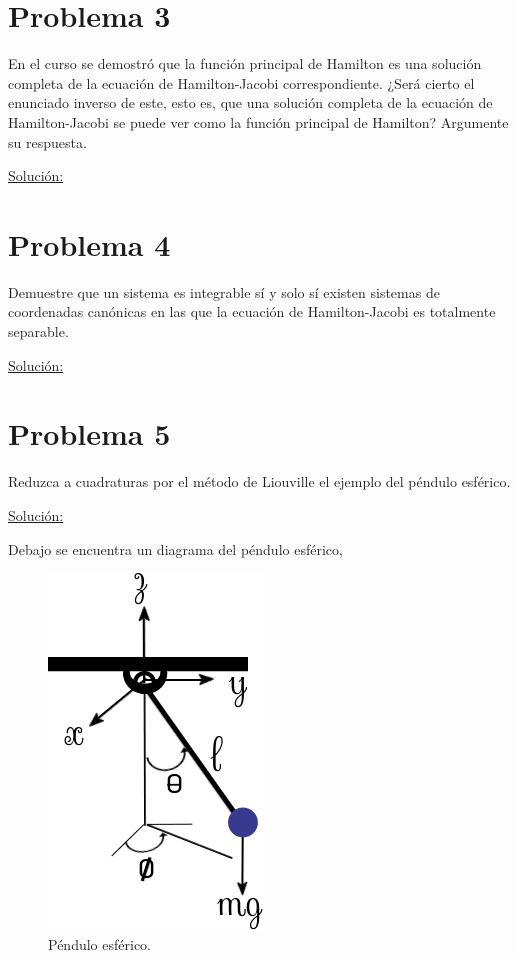 \documentclass[a4paper,10pt]{article}
\numberwithin{equation}{section}
\begin{document}
\section{Problema 3}

En el curso se demostró que la función principal de Hamilton es una solución completa 
de la ecuación de Hamilton-Jacobi correspondiente. ¿Será cierto el enunciado inverso 
de este, esto es, que una solución completa de la ecuación de Hamilton-Jacobi se puede 
ver como la función principal de Hamilton? Argumente su respuesta.

\vspace{.3cm}

\underline{Solución:} \vspace{.3cm}

\section{Problema 4}

Demuestre que un sistema es integrable sí y solo sí existen sistemas de coordenadas 
canónicas en las que la ecuación de Hamilton-Jacobi es totalmente separable.

\vspace{.3cm}

\underline{Solución:} \vspace{.3cm}

\section{Problema 5}

Reduzca a cuadraturas por el método de Liouville el ejemplo del péndulo esférico.

\vspace{.3cm}

\underline{Solución:} \vspace{.3cm}

Debajo se encuentra un diagrama del péndulo esférico,

\begin{figure}[H]
 \center 
 \includegraphics[scale=0.6]{problema5fig1}
 \caption{Péndulo esférico.}
 \label{fig:problema5fig1}
\end{figure}
\end{document}

